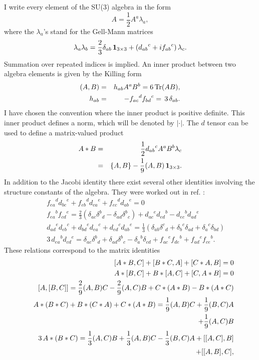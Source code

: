 \documentclass[a4paper,12pt]{article}
\begin{document}
I write every element of the SU(3) algebra in the form
$$A = \frac{1}{2} A^a \lambda_a,$$
where the $\lambda_a$'s stand for the Gell-Mann matrices
$$\lambda_a \lambda_b = \frac{2}{3} \delta_{ab} \, {\bf 1}_{3 \times 3} + \left( {d_{ab}}^c + i {f_{ab}}^c
\right) \lambda_c.$$
Summation over repeated indices is implied. An inner product between two
algebra elements is given by the Killing form
\begin{eqnarray*}
(A,B) &=& h_{ab} A^a B^b = 6 \, {\rm Tr} (AB), \\*
h_{ab} &=& - {f_{ac}}^d {f_{bd}}^c = \, 3 \, \delta_{ab}.
\end{eqnarray*}
I have chosen the convention where the inner product is positive definite.
This inner product defines a norm, which will be denoted by $|\cdot|$. The $d$
tensor can be used to define a matrix-valued product
\begin{eqnarray*}
A*B &=& \frac{1}{2} {d_{ab}}^c A^a B^b \lambda_c \\*
 &=& \{A,B\} - \frac{1}{9} (A,B) \, {\bf 1}_{3 \times 3}.
\end{eqnarray*}
In addition to the Jacobi identity there exist several other identities involving the
structure constants of the algebra. They were worked out in ref. \cite{msw}:
\begin{eqnarray}
&&{f_{ea}}^d {d_{bc}}^e + {f_{eb}}^d {d_{ca}}^e + {f_{ec}}^d {d_{ab}}^e = 0
 \label{id1} \\
&&{f_{ea}}^b {f_{cd}}^e = \frac{2}{3} \left( \delta_{ac} {\delta^b}_d - \delta_{ad}
 {\delta^b}_c \right) + {d_{ac}}^e {d_{ed}}^b - {d_{ec}}^b {d_{ad}}^e \\
&&{d_{ad}}^e {d_{eb}}^c + {d_{bd}}^e {d_{ea}}^c + {d_{ed}}^c {d_{ab}}^e = \frac{1}{3} \left( \delta_{ab} {\delta^c}_d + {\delta_b}^c \delta_{ad} + {\delta_a}^c \delta_{bd}  \right) \\
&& 3 \, {d_{ea}}^b {d_{cd}}^e = \delta_{ac} {\delta^b}_d + \delta_{ad} {\delta^b}_c
- {\delta_a}^b \delta_{cd} + {f_{ac}}^e {f_{de}}^b + {f_{ad}}^e {f_{ce}}^b.
\end{eqnarray}
These relations correspond to the matrix identities
\begin{eqnarray}
&&[A*B,C] + [B*C,A] + [C*A,B] = 0 \label{ego1} \\
&&A*[B,C] + B*[A,C] + [C,A*B] = 0 \label{ego2} \\
&&{[A,[B,C]]} = \frac{2}{9} (A,B) C - \frac{2}{9} (A,C) B + C*(A*B) - B*(A*C) \label{ego3} \\
&&A*(B*C) + B*(C*A) + C*(A*B) = \frac{1}{9} (A,B) C + \frac{1}{9} (B,C) A \nonumber \\*
&& \hspace{18.9em} + \frac{1}{9} (A,C) B \label{ego4} \\
&& 3 \, A*(B*C) = \frac{1}{3} (A,C) B + \frac{1}{3} (A,B) C - \frac{1}{3} (B,C) A + [[A,C],B] \nonumber \\*
&& \hspace{7em} + [[A,B],C], \label{ego5}
\end{eqnarray}
\end{document}
